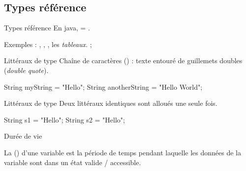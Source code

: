 \begin{hideedit}
\subsection{Types référence}
\begin{frame}{Types référence}
  En java,  = .

  Exemples : , , , les \textit{tableaux}.
  ;
\end{frame}

\begin{frame}[fragile]{Littéraux de type }
  Chaîne de caractères () : texte entouré de guillemets doubles
  (\textit{double quote}).
  \begin{java}
String myString = "Hello";
String anotherString = "Hello \n World";
  \end{java}
\end{frame}

\begin{frame}[fragile]{Littéraux de type }
  Deux littéraux identiques sont alloués \alert{une seule} fois.
  \begin{java}
String s1 = "Hello";
String s2 = "Hello";
  \end{java}

  \begin{center}
  \end{center}
\end{frame}

\begin{frame}{Durée de vie}
  \begin{definition}
    La  (\textit{}) d'une variable
    est la période de temps pendant laquelle les données de la variable
    sont dans un état valide / accessible.
  \end{definition}


\end{frame}
\end{hideedit}
